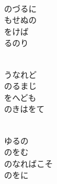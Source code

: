 \documentclass[10pt,b5j]{tarticle} %
\begin{document}
\vspace{1.5em} %
\newcommand{\linespace}{0.5em} %
\newcommand{\blocksize}{0.5\hsize} %
\newcommand{\itemmargin}{3em} %
\begin{enumerate} %
    \setlength{\itemindent}{\itemmargin} %
    \begin{minipage}[c]{\blocksize}
    
        \vspace{\linespace}
        \item~\\
        のづるに\\
        もせぬの\\
        をけば\\
        るのり
        
    \end{minipage}
    \begin{minipage}[c]{\blocksize}
        
        \vspace{\linespace}
        \item~\\
        うなれど\\
        のるまじ\\
        をへども\\
        のきはをて
        
    \end{minipage}
    \begin{minipage}[c]{\blocksize}
        
        \vspace{\linespace}
        \item~\\
        ゆるの\\
        のをむ\\
        のなればこそ\\
        のをに
        

\end{minipage}
\end{enumerate}
\end{document}
